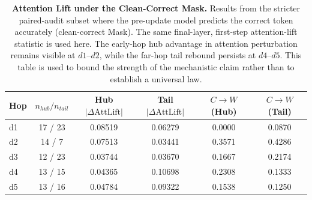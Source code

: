 \begin{table}[htbp]
\centering
\small
\begin{tabular}{lccccc}
\toprule
\textbf{Hop} & \textbf{$n_{hub}/n_{tail}$} & \textbf{Hub $|\Delta \mathrm{AttLift}|$} & \textbf{Tail $|\Delta \mathrm{AttLift}|$} & \textbf{$C \rightarrow W$ (Hub)} & \textbf{$C \rightarrow W$ (Tail)} \\
\midrule
d1 & 17 / 23 & 0.08519 & 0.06279 & 0.0000 & 0.0870 \\
d2 & 14 / 7  & 0.07513 & 0.03441 & 0.3571 & 0.4286 \\
d3 & 12 / 23 & 0.03744 & 0.03670 & 0.1667 & 0.2174 \\
d4 & 13 / 15 & 0.04365 & 0.10698 & 0.2308 & 0.1333 \\
d5 & 13 / 16 & 0.04784 & 0.09322 & 0.1538 & 0.1250 \\
\bottomrule
\end{tabular}
\caption{\label{tab:attention_lift_masked} \textbf{Attention Lift under the Clean-Correct Mask.} Results from the stricter paired-audit subset where the pre-update model predicts the correct token accurately (clean-correct Mask). The same final-layer, first-step attention-lift statistic is used here. The early-hop hub advantage in attention perturbation remains visible at $d1$--$d2$, while the far-hop tail rebound persists at $d4$--$d5$. This table is used to bound the strength of the mechanistic claim rather than to establish a universal law.}
\end{table}
